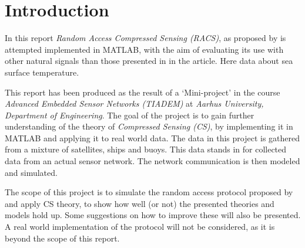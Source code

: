 \documentclass[Main]{subfiles}
\begin{document}
\section{Introduction} %
\label{sec:introduction}
	In this report \emph{Random Access Compressed Sensing (RACS)}, as proposed by \cite{Fazel2011} is attempted implemented in MATLAB, with the aim of evaluating its use with other natural signals than those presented in in the article.
	Here data about sea surface temperature.

	This report has been produced as the result of a `Mini-project' in the course \emph{Advanced Embedded Sensor Networks (TIADEM)} at \emph{Aarhus University, Department of Engineering}.
	The goal of the project is to gain further understanding of the theory of \emph{Compressed Sensing (CS)}, by implementing it in MATLAB and applying it to real world data.
	The data in this project is gathered from a mixture of satellites, ships and buoys.
	This data stands in for collected data from an actual sensor network.
	The network communication is then modeled and simulated.

	The scope of this project is to simulate the random access protocol proposed by \cite{Fazel2011} and apply CS theory, to show how well (or not) the presented theories and models hold up.
	Some suggestions on how to improve these will also be presented.
	A real world implementation of the protocol will not be considered, as it is beyond the scope of this report.



\end{document}
